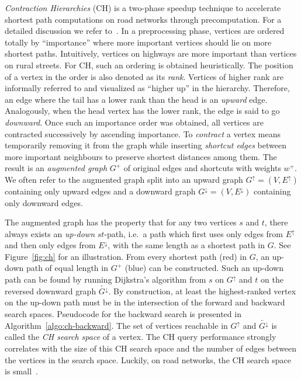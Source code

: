 \documentclass[manuscript]{acmart}
\newcommand*{\gchu}{G^{\uparrow}}
\newcommand*{\gchd}{G^{\downarrow}}
\newcommand*{\rgchd}{\overleftarrow{G^{\downarrow}}}
\newcommand*{\echu}{E^{\uparrow}}
\newcommand*{\echd}{E^{\downarrow}}
\begin{document}
\emph{Contraction Hierarchies} (CH) is a two-phase speedup technique to accelerate shortest path computations on road networks through precomputation.
For a detailed discussion we refer to~\cite{gssv-erlrn-12}.
In a preprocessing phase, vertices are ordered totally by ``importance'' where more important vertices should lie on more shortest paths.
Intuitively, vertices on highways are more important than vertices on rural streets.
For CH, such an ordering is obtained heuristically.
The position of a vertex in the order is also denoted as its \emph{rank}.
Vertices of higher rank are informally referred to and visualized as ``higher up'' in the hierarchy.
Therefore, an edge where the tail has a lower rank than the head is an \emph{upward} edge.
Analogously, when the head vertex has the lower rank, the edge is said to go \emph{downward}.
Once such an importance order was obtained, all vertices are contracted successively by ascending importance.
To \emph{contract} a vertex means temporarily removing it from the graph while inserting \emph{shortcut edges} between more important neighbours to preserve shortest distances among them.
The result is an \emph{augmented graph} $G^+$ of original edges and shortcuts with weights $w^+$.
We often refer to the augmented graph split into an upward graph $\gchu = (V, \echu)$ containing only upward edges and a downward graph $\gchd = (V, \echd)$ containing only downward edges.

The augmented graph has the property that for any two vertices $s$ and $t$, there always exists an \emph{up-down} $st$-path, i.e.\ a path which first uses only edges from $\echu$ and then only edges from $\echd$, with the same length as a shortest path in $G$.
See Figure~\ref{fig:ch} for an illustration.
From every shortest path (red) in $G$, an up-down path of equal length in $G^+$ (blue) can be constructed.
Such an up-down path can be found by running Dijkstra's algorithm from $s$ on $\gchu$ and $t$ on the reversed downward graph $\rgchd$.
By construction, at least the highest-ranked vertex on the up-down path must be in the intersection of the forward and backward search spaces.
Pseudocode for the backward search is presented in Algorithm~\ref{algo:ch-backward}.
The set of vertices reachable in $\gchu$ and $\rgchd$ is called the \emph{CH search space} of a vertex.
The CH query performance strongly correlates with the size of this CH search space and the number of edges between the vertices in the search space.
Luckily, on road networks, the CH search space is small~\cite{gssv-erlrn-12,dgpw-crprn-13}.
\end{document}
